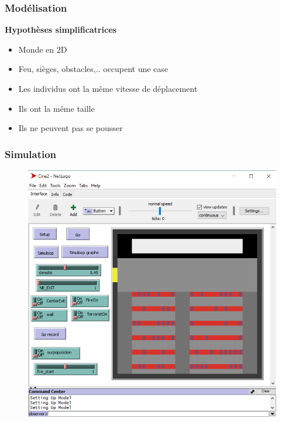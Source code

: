 \documentclass[10pt]{beamer}
\begin{document}
\begin{frame}
	\frametitle{\textbf {\Large Modélisation}}
	\begin{block}{\textbf{Hypothèses simplificatrices}}
	\medskip
	\begin{itemize}
		\item Monde en 2D
		\medskip 
		\item Feu, sièges, obstacles,.. occupent une case
		\medskip 
		\item Les individus ont la même vitesse de déplacement
		\medskip 
		\item Ils ont la même taille
		\medskip 
		\item Ils ne peuvent pas se pousser
	\end{itemize}
	\end{block}
\end{frame}


\begin{frame}
	\frametitle{\textbf {\Large Simulation}}
	\begin{figure}
				\includegraphics[scale=0.45]{capture.PNG}
 				\label{pic: capture}
 			\end{figure}
\end{frame}
\end{document}
